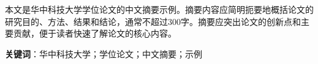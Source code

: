 
本文是华中科技大学学位论文的中文摘要示例。摘要内容应简明扼要地概括论文的研究目的、方法、结果和结论，通常不超过300字。摘要应突出论文的创新点和主要贡献，便于读者快速了解论文的核心内容。

{\CJKsf \sihao \textbf{关键词}}：华中科技大学；学位论文；中文摘要；示例